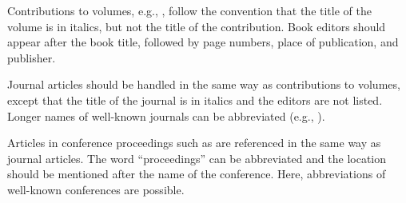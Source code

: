 \documentclass{tls}
\begin{document}
Contributions to volumes, e.g., , follow the convention that the title of the volume is in italics, but not the title of the contribution. Book editors should appear after the book title, followed by page numbers, place of publication, and publisher.

Journal articles should be handled in the same way as contributions to volumes, except that the title of the journal is in italics and the editors are not listed. Longer names of well-known journals can be abbreviated (e.g., ).

Articles in conference proceedings such as  are referenced in the same way as journal articles. The word ``proceedings'' can be abbreviated and the location should be mentioned after the name of the conference. Here, abbreviations of well-known conferences are possible.


\end{document}
